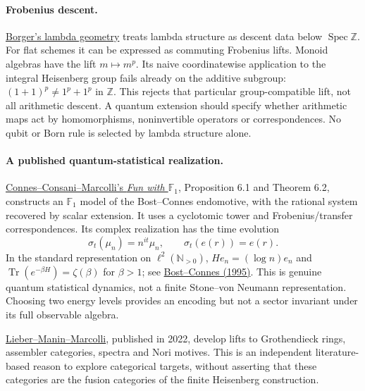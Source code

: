 \paragraph{Frobenius descent.}
\href{https://arxiv.org/abs/0906.3146}{Borger's lambda geometry} treats
lambda structure as descent data below $\operatorname{Spec}\mathbb Z$.
For flat schemes it can be expressed as commuting Frobenius lifts.
Monoid algebras have the lift $m\mapsto m^p$. Its naive coordinatewise
application to the integral Heisenberg group fails already on the
additive subgroup: $(1+1)^p\ne1^p+1^p$ in $\mathbb Z$.
This rejects that particular group-compatible lift, not all arithmetic
descent. A quantum extension should specify whether arithmetic maps act
by homomorphisms, noninvertible operators or correspondences. No qubit
or Born rule is selected by lambda structure alone.

\paragraph{A published quantum-statistical realization.}
\href{https://arxiv.org/abs/0806.2401}{Connes--Consani--Marcolli's
\emph{Fun with $\mathbb F_1$}}, Proposition 6.1 and Theorem 6.2,
constructs an $\mathbb F_1$ model of the Bost--Connes endomotive, with
the rational system recovered by scalar extension. It uses a cyclotomic
tower and Frobenius/transfer correspondences. Its complex realization
has the time evolution
\[
\sigma_t(\mu_n)=n^{it}\mu_n,\qquad \sigma_t(e(r))=e(r).
\]
In the standard representation on $\ell^2(\mathbb N_{>0})$,
$He_n=(\log n)e_n$ and
$\operatorname{Tr}(e^{-\beta H})=\zeta(\beta)$ for $\beta>1$;
see \href{https://repo-archives.ihes.fr/FONDS_IHES/I_Prepublications/CONNES/1994-1998/M_95_38/M_95_38_web.pdf}{Bost--Connes (1995)}.
This is genuine quantum statistical dynamics, not a finite
Stone--von Neumann representation. Choosing two energy levels provides
an encoding but not a sector invariant under its full observable algebra.

\href{https://arxiv.org/abs/1901.00020}{Lieber--Manin--Marcolli}, published
in 2022, develop lifts to Grothendieck rings, assembler categories,
spectra and Nori motives. This is an independent literature-based reason
to explore categorical targets, without asserting that these categories
are the fusion categories of the finite Heisenberg construction.

